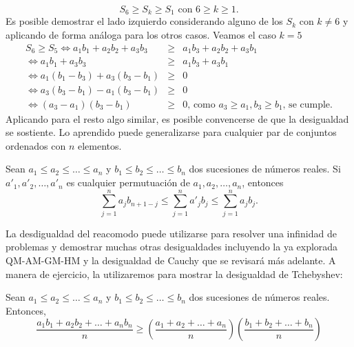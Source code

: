 \documentclass[11pt]{scrartcl}
\begin{document}
\begin{equation*}
    S_6 \geq S_k \geq S_1 \text{ con } 6 \geq k \geq 1.
\end{equation*}
Es posible demostrar el lado izquierdo considerando alguno de los $S_k$ con $k \neq 6$ y aplicando de forma an\'aloga para los otros casos. Veamos el caso $k = 5$
\begin{eqnarray*}
    S_6 \geq S_5 \iff a_1b_1 + a_2b_2 + a_3b_3 &\geq& a_1b_3 + a_2b_2 + a_3b_1\\
    \iff a_1b_1 + a_3b_3 &\geq& a_1b_3 + a_3b_1\\
    \iff a_1\left(b_1 - b_3\right) + a_3\left(b_3 - b_1\right) &\geq& 0\\
    \iff a_3\left(b_3 - b_1\right) - a_1\left(b_3 - b_1\right) &\geq& 0\\
    \iff \left(a_3 - a_1\right)\left(b_3 - b_1\right) &\geq& 0 \text{, como } a_3 \geq a_1, b_3 \geq b_1 \text{, se cumple.}
\end{eqnarray*}
Aplicando para el resto algo similar, es posible convencerse de que la desigualdad se sostiente. Lo aprendido puede generalizarse para cualquier par de conjuntos ordenados con $n$ elementos.

\begin{theorem} [Reacomodo]
Sean $a_1 \leq a_2 \leq \dots \leq a_n$ y $b_1 \leq b_2 \leq \dots \leq b_n$ dos sucesiones de n\'umeros reales. Si $a'_1, a'_2, \dots, a'_n$ es cualquier permutuaci\'on de $a_1, a_2, \dots, a_n$, entonces
$$\sum_{j=1}^{n} a_jb_{n+1-j} \leq \sum_{j=1}^{n} a'_jb_{j} \leq \sum_{j=1}^{n} a_jb_{j}.$$
\end{theorem}

\noindent
La desdigualdad del reacomodo puede utilizarse para resolver una infinidad de problemas y demostrar muchas otras desigualdades incluyendo la ya explorada QM-AM-GM-HM y la desigualdad de Cauchy que se revisar\'a m\'as adelante. A manera de ejercicio, la utilizaremos para mostrar la desigualdad de Tchebyshev:

\begin{theorem} [Tchebyshev]
Sean $a_1 \leq a_2 \leq \dots \leq a_n$ y $b_1 \leq b_2 \leq \dots \leq b_n$ dos sucesiones de n\'umeros reales. Entonces,
$$\frac{a_1b_1+a_2b_2 + \dots + a_nb_n}{n} \geq \left(\frac{a_1+a_2+\dots+a_n}{n}\right)\left(\frac{b_1+b_2+\dots+b_n}{n}\right)$$
\end{theorem}
\end{document}
